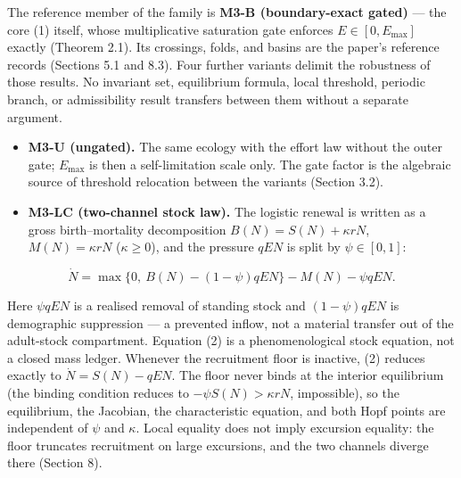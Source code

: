 \documentclass[11pt]{article}
\begin{document}
The reference member of the family is \textbf{M3-B (boundary-exact
gated)} --- the core (1) itself, whose multiplicative saturation gate
enforces \(E \in [0, E_{\max}]\) exactly (Theorem 2.1). Its crossings,
folds, and basins are the paper's reference records (Sections 5.1 and
8.3). Four further variants delimit the robustness of those results. No
invariant set, equilibrium formula, local threshold, periodic branch, or
admissibility result transfers between them without a separate argument.

\begin{itemize}
\item
  \textbf{M3-U (ungated).} The same ecology with the effort law without
  the outer gate; \(E_{\max}\) is then a self-limitation scale only. The
  gate factor is the algebraic source of threshold relocation between
  the variants (Section 3.2).
\item
  \textbf{M3-LC (two-channel stock law).} The logistic renewal is
  written as a gross birth--mortality decomposition
  \(B(N) = S(N) + \kappa rN\), \(M(N) = \kappa rN\) (\(\kappa \ge 0\)),
  and the pressure \(qEN\) is split by \(\psi \in [0,1]\):
\end{itemize}

\[\dot N = \max\{0,\ B(N) - (1-\psi)qEN\} - M(N) - \psi qEN. \tag{2}\]

Here \(\psi qEN\) is a realised removal of standing stock and
\((1-\psi)qEN\) is demographic suppression --- a prevented inflow, not a
material transfer out of the adult-stock compartment. Equation (2) is a
phenomenological stock equation, not a closed mass ledger. Whenever the
recruitment floor is inactive, (2) reduces exactly to
\(\dot N = S(N) - qEN\). The floor never binds at the interior
equilibrium (the binding condition reduces to
\(-\psi S(N) > \kappa rN\), impossible), so the equilibrium, the
Jacobian, the characteristic equation, and both Hopf points are
independent of \(\psi\) and \(\kappa\). Local equality does not imply
excursion equality: the floor truncates recruitment on large excursions,
and the two channels diverge there (Section 8).
\end{document}
